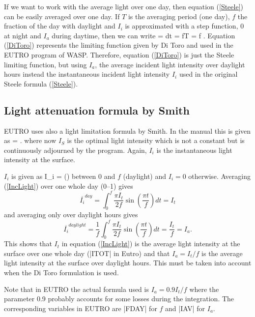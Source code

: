 If we want to work with the average light over one day, then
equation (\ref{Steele}) can be easily averaged over one day.
If $T$ is the averaging period (one day), $f$ the fraction of the day with
daylight and $I_i$ is approximated with a step function, 0 at night
and $I_a$ during daytime, then we can write
\beq \label{DiToro}
\POO =  \int \PO dt 
	=  fT  
	=  f .
\eeq
Equation (\ref{DiToro}) represents the limiting function given by Di Toro
and used in the EUTRO program of WASP. Therefore, equation (\ref{DiToro})
is just the Steele limiting function, but using $I_a$, the average 
incident light intensity over daylight hours instead the 
instantaneous incident light intensity $I_i$ used in the original
Steele formula (\ref{Steele}).


\subsection{Light attenuation formula by Smith}

EUTRO uses also a light limitation formula by Smith. In the manual
this is given as 
\beq \label{Smith}
\PO =  .
\eeq
where now $I_S$ is the optimal light intensity which is not a constant but is
continuously adjourned by the program. Again, $I_i$ is
the instantaneous light intensity at the surface.

$I_i$ is given as
\beq \label{IncLight}
I_i =  \sin ()
\eeq
between 0 and $f$ (daylight) and $I_i=0$ otherwise.
Averaging (\ref{IncLight}) over one whole day (0--1) gives
\[
\overline{I_i}^{day} = \int_0^f \frac{\pi I_t}{2f} \sin (\frac{\pi t}{f}) dt
	= I_t
\]
and averaging only over daylight hours gives
\[
\overline{I_i}^{daylight} = 
	\frac{1}{f} \int_0^f \frac{\pi I_t}{2f} \sin (\frac{\pi t}{f}) dt
	= \frac{I_t}{f} = I_a.
\]
This shows that $I_t$ in equation (\ref{IncLight}) is the average
light intensity at the surface over one whole day (|ITOT| in Eutro)
and that $I_a = I_t/f$ is the average light intensity at the surface
over daylight hours. This must be taken into account when the
Di Toro formulation is used.

Note that in EUTRO the actual formula used is 
$I_a = 0.9 I_t/f$ where the parameter 0.9 probably accounts
for some losses during the integration. The corresponding
variables in EUTRO are |FDAY| for $f$ and |IAV| for $I_a$.




%
